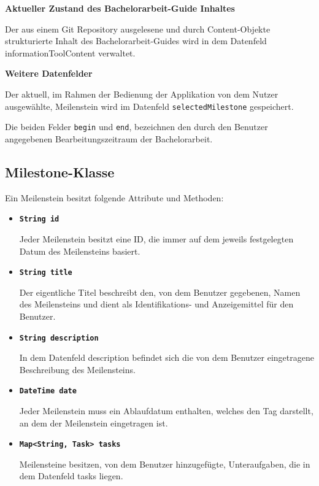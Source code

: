 \documentclass[bibliography=totoc,listof=totoc,BCOR=5mm,DIV=12,oneside]{scrbook}
\begin{document}
{\par \bigskip \textbf{Aktueller Zustand des Bachelorarbeit-Guide Inhaltes}
\par Der aus einem Git Repository ausgelesene und durch Content-Objekte strukturierte Inhalt des Bachelorarbeit-Guides wird in dem Datenfeld informationToolContent verwaltet.

\par \bigskip \textbf{Weitere Datenfelder}
\par Der aktuell, im Rahmen der Bedienung der Applikation von dem Nutzer ausgewählte, Meilenstein wird im Datenfeld \texttt{selectedMilestone} gespeichert. 
\par \medskip Die beiden Felder \texttt{begin} und \texttt{end}, bezeichnen den durch den Benutzer angegebenen Bearbeitungszeitraum der Bachelorarbeit.

\newpage
\subsection{Milestone-Klasse}
\par Ein Meilenstein besitzt folgende Attribute und Methoden:

\begin{itemize}

\item[] \texttt{\textbf{String id}}
\par Jeder Meilenstein besitzt eine ID, die immer auf dem jeweils festgelegten Datum des Meilensteins basiert.

\item[] \texttt{\textbf{String title}}
\par Der eigentliche Titel beschreibt den, von dem Benutzer gegebenen, Namen des Meilensteins und dient als Identifikations- und Anzeigemittel für den Benutzer.

\item[] \texttt{\textbf{String description}}
\par In dem Datenfeld description befindet sich die von dem Benutzer eingetragene Beschreibung des Meilensteins.

\item[] \texttt{\textbf{DateTime date}}
\par Jeder Meilenstein muss ein Ablaufdatum enthalten, welches den Tag darstellt, an dem der Meilenstein eingetragen ist.

\item[] \texttt{\textbf{Map<String, Task> tasks}}
\par Meilensteine besitzen, von dem Benutzer hinzugefügte, Unteraufgaben, die in dem Datenfeld tasks liegen.


\end{itemize}}
\end{document}
